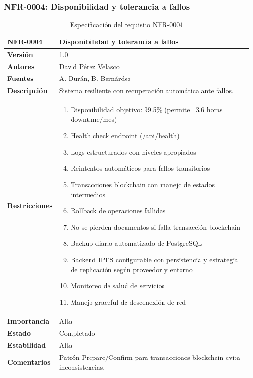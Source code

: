 \documentclass[11pt, a4paper]{article}
\begin{document}
\subsubsection{NFR-0004: Disponibilidad y tolerancia a fallos}

\begin{table}[H]
    \centering
    \small
    \begin{tabular}{|p{4cm}|p{10cm}|}
    \hline
    \textbf{NFR-0004} & Disponibilidad y tolerancia a fallos \\
    \hline
    \textbf{Versión} & 1.0 \\
    \hline
    \textbf{Autores} & David Pérez Velasco \\
    \hline
    \textbf{Fuentes} & A. Durán, B. Bernárdez \\
    \hline
    \textbf{Descripción} & Sistema resiliente con recuperación automática ante fallos. \\
    \hline
    \textbf{Restricciones} & 
    \begin{enumerate}
        \item Disponibilidad objetivo: 99.5\% (permite ~3.6 horas downtime/mes)
        \item Health check endpoint (/api/health)
        \item Logs estructurados con niveles apropiados
        \item Reintentos automáticos para fallos transitorios
        \item Transacciones blockchain con manejo de estados intermedios
        \item Rollback de operaciones fallidas
        \item No se pierden documentos si falla transacción blockchain
        \item Backup diario automatizado de PostgreSQL
        \item Backend IPFS configurable con persistencia y estrategia de replicación según proveedor y entorno
        \item Monitoreo de salud de servicios
        \item Manejo graceful de desconexión de red
    \end{enumerate} \\
    \hline
    \textbf{Importancia} & Alta \\
    \hline
    \textbf{Estado} & Completado \\
    \hline
    \textbf{Estabilidad} & Alta \\
    \hline
    \textbf{Comentarios} & Patrón Prepare/Confirm para transacciones blockchain evita inconsistencias. \\
    \hline
    \end{tabular}
    \caption{Especificación del requisito NFR-0004}
\end{table}
\end{document}
